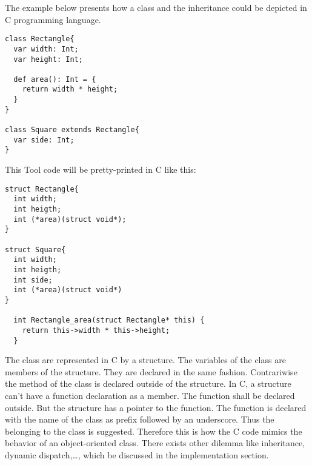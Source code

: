 The example below presents how a class and the inheritance could be depicted in C programming language.
\lstset{style=customtool}
\begin{lstlisting}
class Rectangle{
  var width: Int;
  var height: Int;

  def area(): Int = {
    return width * height;
  }
}

class Square extends Rectangle{
  var side: Int;
}
\end{lstlisting}
This Tool code will be pretty-printed in C like this:
\lstset{style=customc}
\begin{lstlisting}
struct Rectangle{
  int width;
  int heigth;
  int (*area)(struct void*);
}

struct Square{
  int width;
  int heigth;
  int side;
  int (*area)(struct void*)
}

  int Rectangle_area(struct Rectangle* this) {
    return this->width * this->height;
  }
\end{lstlisting}
The class are represented in C by a structure. The variables of the class
are members of the structure. They are declared in the same fashion.
\newline
Contrariwise the method of the class is declared outside of the structure.
In C, a structure can't have a function declaration as a member. The function shall
be declared outside. But the structure has a pointer to the function.
\newline
The function is declared with the name of the class as prefix followed by an underscore.
Thus the belonging to the  class is suggested.
\newline
Therefore this is how the C code mimics the behavior of an object-oriented class.
\newline
There exists other dilemma like inheritance, dynamic dispatch,\ldots, which be discussed
in the implementation section.
\newline
